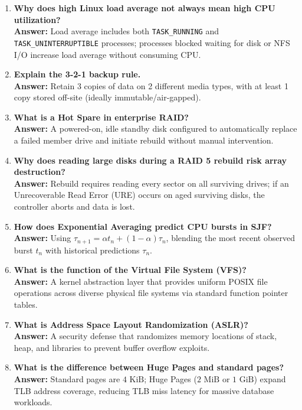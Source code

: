 \begin{enumerate}[label=\textbf{Q\arabic*.},leftmargin=1.2cm]
\item \textbf{Why does high Linux load average not always mean high CPU utilization?} \\
\textbf{Answer:} Load average includes both \texttt{TASK\_RUNNING} and \texttt{TASK\_UNINTERRUPTIBLE} processes; processes blocked waiting for disk or NFS I/O increase load average without consuming CPU.

\item \textbf{Explain the 3-2-1 backup rule.} \\
\textbf{Answer:} Retain 3 copies of data on 2 different media types, with at least 1 copy stored off-site (ideally immutable/air-gapped).

\item \textbf{What is a Hot Spare in enterprise RAID?} \\
\textbf{Answer:} A powered-on, idle standby disk configured to automatically replace a failed member drive and initiate rebuild without manual intervention.

\item \textbf{Why does reading large disks during a RAID 5 rebuild risk array destruction?} \\
\textbf{Answer:} Rebuild requires reading every sector on all surviving drives; if an Unrecoverable Read Error (URE) occurs on aged surviving disks, the controller aborts and data is lost.

\item \textbf{How does Exponential Averaging predict CPU bursts in SJF?} \\
\textbf{Answer:} Using $\tau_{n+1} = \alpha t_n + (1-\alpha)\tau_n$, blending the most recent observed burst $t_n$ with historical predictions $\tau_n$.

\item \textbf{What is the function of the Virtual File System (VFS)?} \\
\textbf{Answer:} A kernel abstraction layer that provides uniform POSIX file operations across diverse physical file systems via standard function pointer tables.

\item \textbf{What is Address Space Layout Randomization (ASLR)?} \\
\textbf{Answer:} A security defense that randomizes memory locations of stack, heap, and libraries to prevent buffer overflow exploits.

\item \textbf{What is the difference between Huge Pages and standard pages?} \\
\textbf{Answer:} Standard pages are $4\text{ KiB}$; Huge Pages ($2\text{ MiB}$ or $1\text{ GiB}$) expand TLB address coverage, reducing TLB miss latency for massive database workloads.


\end{enumerate}
